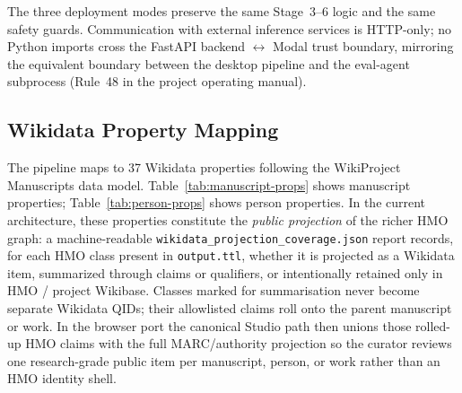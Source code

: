 \documentclass[Afour,sageh,times]{sagej}
\begin{document}
The three deployment modes preserve the same Stage~3--6 logic and the same safety guards. Communication with external inference services is HTTP-only; no Python imports cross the FastAPI backend $\leftrightarrow$ Modal trust boundary, mirroring the equivalent boundary between the desktop pipeline and the eval-agent subprocess (Rule~48 in the project operating manual).

\subsection{Wikidata Property Mapping}

The pipeline maps to 37 Wikidata properties following the WikiProject Manuscripts data model. Table~\ref{tab:manuscript-props} shows manuscript properties; Table~\ref{tab:person-props} shows person properties. In the current architecture, these properties constitute the \emph{public projection} of the richer HMO graph: a machine-readable \texttt{wikidata\_projection\_coverage.json} report records, for each HMO class present in \texttt{output.ttl}, whether it is projected as a Wikidata item, summarized through claims or qualifiers, or intentionally retained only in HMO / project Wikibase. Classes marked for summarisation never become separate Wikidata QIDs; their allowlisted claims roll onto the parent manuscript or work. In the browser port the canonical Studio path then unions those rolled-up HMO claims with the full MARC/authority projection so the curator reviews one research-grade public item per manuscript, person, or work rather than an HMO identity shell.
\end{document}
